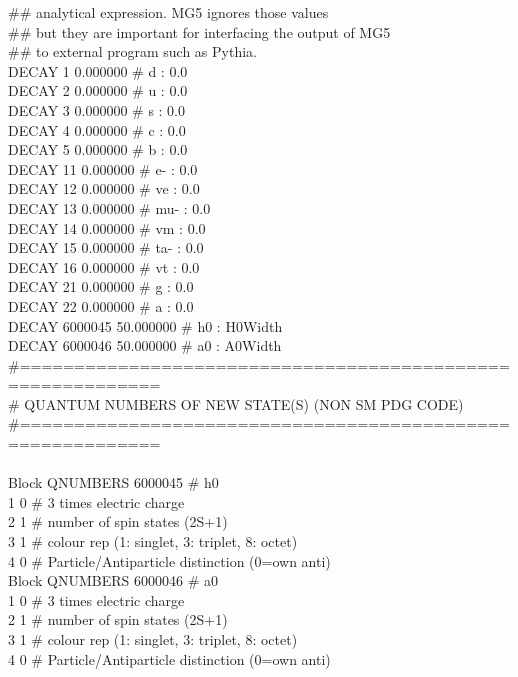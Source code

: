 {\#\# analytical expression. MG5 ignores those values\\ 
\#\# but they are important for interfacing the output of MG5\\
\#\# to external program such as Pythia.\\
DECAY  1 0.000000 \# d : 0.0 \\
DECAY  2 0.000000 \# u : 0.0 \\
DECAY  3 0.000000 \# s : 0.0 \\
DECAY  4 0.000000 \# c : 0.0 \\
DECAY  5 0.000000 \# b : 0.0 \\
DECAY  11 0.000000 \# e- : 0.0 \\
DECAY  12 0.000000 \# ve : 0.0 \\
DECAY  13 0.000000 \# mu- : 0.0 \\
DECAY  14 0.000000 \# vm : 0.0 \\
DECAY  15 0.000000 \# ta- : 0.0 \\
DECAY  16 0.000000 \# vt : 0.0 \\
DECAY  21 0.000000 \# g : 0.0 \\
DECAY  22 0.000000 \# a : 0.0 \\
DECAY  6000045 50.000000 \# h0 : H0Width \\
DECAY  6000046 50.000000 \# a0 : A0Width \\
\#===========================================================\\
\# QUANTUM NUMBERS OF NEW STATE(S) (NON SM PDG CODE)\\
\#===========================================================\\
\\
Block QNUMBERS 6000045  \# h0 \\
        1 0  \# 3 times electric charge\\
        2 1  \# number of spin states (2S+1)\\
        3 1  \# colour rep (1: singlet, 3: triplet, 8: octet)\\
        4 0  \# Particle/Antiparticle distinction (0=own anti)\\
Block QNUMBERS 6000046  \# a0 \\
        1 0  \# 3 times electric charge\\
        2 1  \# number of spin states (2S+1)\\
        3 1  \# colour rep (1: singlet, 3: triplet, 8: octet)\\
        4 0  \# Particle/Antiparticle distinction (0=own anti)\\
 }

\label{app1}


\clearpage{\pagestyle{empty}\cleardoublepage}
